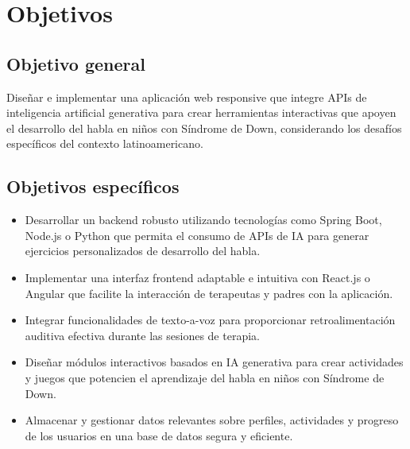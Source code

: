 \chapter{Objetivos}

\section{Objetivo general}
Diseñar e implementar una aplicación web responsive que integre APIs de inteligencia artificial generativa para crear herramientas interactivas que apoyen el desarrollo del habla en niños con Síndrome de Down, considerando los desafíos específicos del contexto latinoamericano.

\section{Objetivos específicos}
\begin{itemize}
    \item Desarrollar un backend robusto utilizando tecnologías como Spring Boot, Node.js o Python que permita el consumo de APIs de IA para generar ejercicios personalizados de desarrollo del habla.
    \item Implementar una interfaz frontend adaptable e intuitiva con React.js o Angular que facilite la interacción de terapeutas y padres con la aplicación.
    \item Integrar funcionalidades de texto-a-voz para proporcionar retroalimentación auditiva efectiva durante las sesiones de terapia.
    \item Diseñar módulos interactivos basados en IA generativa para crear actividades y juegos que potencien el aprendizaje del habla en niños con Síndrome de Down.
    \item Almacenar y gestionar datos relevantes sobre perfiles, actividades y progreso de los usuarios en una base de datos segura y eficiente.
\end{itemize}
